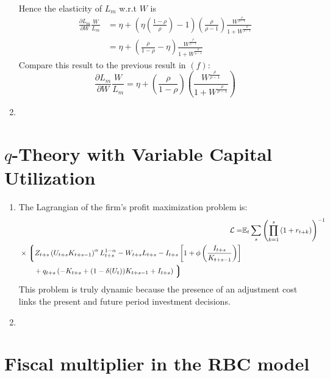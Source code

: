 \documentclass[11pt]{amsart}
\begin{document}
\begin{enumerate}[label = (\alph*)]
\begin{equation*}
	\end{equation*}
	Hence the elasticity of $L_m$ w.r.t $W$ is
	\begin{align*}
	\frac{\partial L_m}{\partial W} \frac{W}{L_m} &= \eta + \left( \eta \left( \frac{1-\rho}{\rho} \right) -1  \right) \left( \frac{\rho}{\rho-1} \right) \frac{W^{\frac{\rho}{\rho-1}}}{1 + W^{\frac{\rho}{\rho-1}}} \\
	& = \eta + \left(  \frac{\rho}{1-\rho} - \eta \right) \frac{W^{\frac{\rho}{\rho-1}}}{1 + W^{\frac{\rho}{\rho-1}}}
	\end{align*}
	Compare this result to the previous result in $(f)$:
	\begin{equation*}
	\frac{\partial L_m}{\partial W} \frac{W}{L_m} = \eta + \left( \frac{\rho}{1-\rho} \right) \left( \frac{W^{\frac{\rho}{\rho-1}}}{1 + W^{\frac{\rho}{\rho-1}}} \right)
	\end{equation*}
	\item

\end{enumerate}

\section{$q$-Theory with Variable Capital Utilization}
\begin{enumerate}[label = (\alph*)]
	\item The Lagrangian of the firm's profit maximization problem is: 
	\begin{align*}
	\mathcal{L} =& \mathbb{E}_t \sum_{s} \left( \prod_{k=1}^{s} \left(1 + r_{t+k} \right) \right)^{-1} \\
	\begin{split}
	&\times \left\lgroup  Z_{t+s} \left( U_{t+s} K_{t+s-1}  \right)^{\alpha} L_{t+s}^{1-\alpha}  - W_{t+s} L_{t+s} - I_{t+s} \left[ 1 + \phi \left( \frac{I_{t+s}}{K_{t+s-1}} \right) \right] \right. \\
	& \qquad + q_{t+s} \left( -K_{t+s} + (1-\delta(U_t))K_{t+s-1} + I_{t+s} \right) \left. \right\rgroup
	\end{split}
	\end{align*}
	This problem is truly dynamic because the presence of an adjustment cost links the present and future period investment decisions. 
	\item 
\end{enumerate}
\section{Fiscal multiplier in the RBC model}
\end{document}
